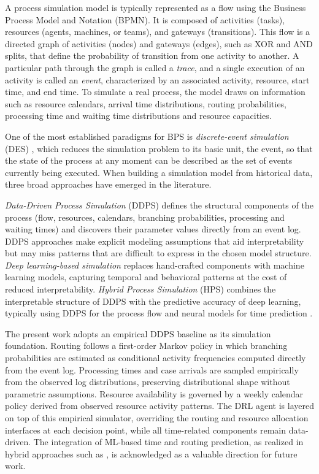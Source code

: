 \documentclass[journal,onecolumn]{IEEEtran}
\begin{document}
A process simulation model is typically represented as a flow using the
Business Process Model and Notation (BPMN). It is composed of activities
(tasks), resources (agents, machines, or teams), and gateways (transitions).
This flow is a directed graph of activities (nodes) and gateways (edges),
such as XOR and AND splits, that define the probability of transition from
one activity to another. A particular path through the graph is called a
\emph{trace}, and a single execution of an activity is called an \emph{event},
characterized by an associated activity, resource, start time, and end time.
To simulate a real process, the model draws on information such as resource
calendars, arrival time distributions, routing probabilities,
processing time and waiting time distributions and resource capacities.

One of the most established paradigms for BPS is \emph{discrete-event
simulation} (DES) \cite{law_kelton_2015, banks_2010, laguna_marklund_2019},
which reduces the simulation problem to its basic unit, the event, so that
the state of the process at any moment can be described as the set of events
currently being executed. When building a simulation model from historical
data, three broad approaches have emerged in the literature.

\emph{Data-Driven Process Simulation} (DDPS) defines the structural
components of the process (flow, resources, calendars, branching
probabilities, processing and waiting times) and discovers their
parameter values directly from an event log.
DDPS approaches make explicit modeling assumptions that aid
interpretability but may miss patterns that are difficult to express in the
chosen model structure. \emph{Deep learning-based simulation} replaces
hand-crafted components with machine learning models, capturing temporal and behavioral
patterns at the cost of reduced interpretability. \emph{Hybrid Process
Simulation} (HPS) combines the interpretable structure of DDPS with the
predictive accuracy of deep learning, typically using DDPS for the process
flow and neural models for time prediction \cite{review_bps,
camargo2023hybrid, Runtime_integration_of_simulation_for_business_processes}.

The present work adopts an empirical DDPS baseline as its simulation
foundation. Routing follows a first-order Markov policy in which branching
probabilities are estimated as conditional activity frequencies computed
directly from the event log. Processing times and case arrivals are sampled
empirically from the observed log distributions, preserving distributional
shape without parametric assumptions. Resource availability is governed by a
weekly calendar policy derived from observed resource activity patterns.
The DRL agent is layered on top of this empirical simulator, overriding the
routing and resource allocation interfaces at each decision point, while all
time-related components remain data-driven. The integration of ML-based time
and routing prediction, as realized in hybrid approaches such as
\cite{Runtime_integration_of_simulation_for_business_processes}, is
acknowledged as a valuable direction for future work.
\end{document}

